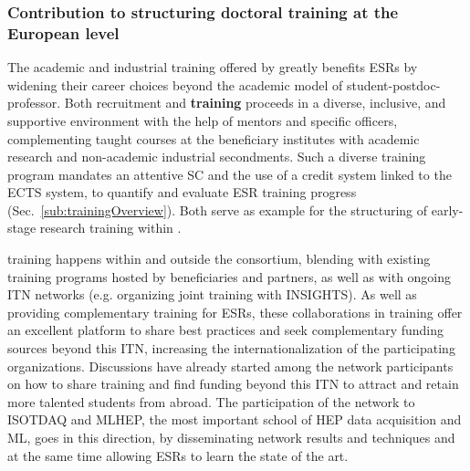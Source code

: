 
\subsubsection*{Contribution to structuring doctoral training at the European level}


The academic and industrial training offered by \acronym greatly benefits ESRs by widening their career choices beyond the academic model of student-postdoc-professor.
Both \acronym recruitment and \textbf{training} proceeds in a diverse, inclusive, and supportive environment with the help of mentors and specific officers, complementing
taught courses at the beneficiary institutes with academic research and non-academic industrial secondments. 
Such a diverse training program mandates an attentive SC and the use of a credit system linked to the ECTS system, to quantify and evaluate ESR training progress (Sec.~\ref{sub:trainingOverview}). 
Both serve as example for the structuring of early-stage research training within \acronym. 

\acronym training happens within and outside the consortium, blending with existing training programs hosted by beneficiaries and partners, as well as with ongoing ITN networks (e.g. organizing joint training with INSIGHTS).
As well as providing complementary training for ESRs, these collaborations in training offer an excellent platform to share best practices and seek complementary funding sources beyond this ITN, increasing the internationalization of the participating organizations. 
Discussions have already started among the network participants on how to share training and find funding beyond this ITN to attract and retain more talented students from abroad. The participation of the network to ISOTDAQ and MLHEP, the most important school of HEP data acquisition and ML, goes in this direction, by disseminating network results and techniques and at the same time allowing ESRs to learn the state of the art. 


